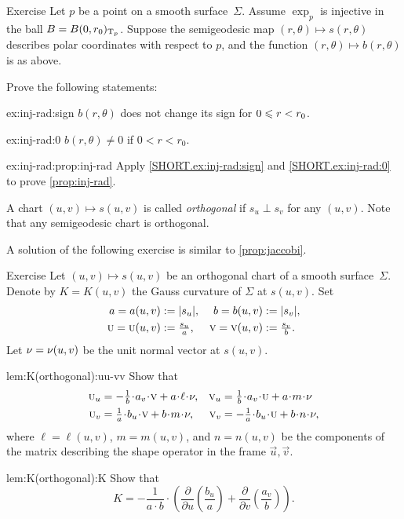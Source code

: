 \begin{thm}{Exercise}\label{ex:inj-rad}
Let $p$ be a point on a smooth surface~$\Sigma$.
Assume $\exp_p$ is injective in the ball $B=B(0,r_0)_{\mathrm{T}_p}$.
Suppose the semigeodesic map $(r,\theta)\mapsto s(r,\theta)$ describes polar coordinates with respect to $p$, and the function $(r,\theta)\mapsto b(r,\theta)$ is as above.

Prove the following statements:

\begin{subthm}{ex:inj-rad:sign}
$b(r,\theta)$ does not change its sign for $0\z\le r\z<r_0$.
\end{subthm}

\begin{subthm}{ex:inj-rad:0}
$b(r,\theta)\ne0$ if $0< r<r_0$.
\end{subthm}

\begin{subthm}{ex:inj-rad:prop:inj-rad}
Apply \ref{SHORT.ex:inj-rad:sign} and \ref{SHORT.ex:inj-rad:0} to prove \ref{prop:inj-rad}.
\end{subthm}
 
\end{thm}



A chart $(u,v)\mapsto s(u,v)$ is called \emph{orthogonal} if $s_u\perp s_v$ for any $(u,v)$.
Note that any semigeodesic chart is orthogonal.

A solution of the following exercise is similar to \ref{prop:jaccobi}.

\begin{thm}{Exercise}\label{lem:K(orthogonal)}
Let $(u,v)\mapsto s(u,v)$ be an orthogonal chart of a smooth surface~$\Sigma$.
Denote by $K=K(u,v)$ the Gauss curvature of $\Sigma$ at $s(u,v)$.
Set 
\begin{align*}
a=a(u,v)&\mathrel{:=}|s_u|,&
b=b(u,v)&\mathrel{:=}|s_v|,\\
\text{\sc{u}}=\text{\sc{u}}(u,v)&\mathrel{:=}\tfrac{s_u}a,&
\text{\sc{v}}=\text{\sc{v}}(u,v)&\mathrel{:=}\tfrac{s_v}b.
\end{align*}
Let $\nu=\nu(u,v)$ be the unit normal vector at $s(u,v)$.

\begin{subthm}{lem:K(orthogonal):uu-vv}
Show that 
\begin{align*}
\vec u_u
&=
-\tfrac1{b}\cdot a_v
\cdot
\vec v 
+
a\cdot \ell\cdot \Norm
,
&
\vec v_u
&=
\tfrac1{b}\cdot a_v
\cdot \vec u
+
a\cdot m\cdot \Norm
\\
\vec u_v
&=
\tfrac1{a}\cdot b_u\cdot\vec v
+
b\cdot m\cdot \Norm
,
&
\vec v_v
&=
-\tfrac1{a}\cdot b_u\cdot\vec u
+
b\cdot n\cdot \Norm,
\end{align*}
where $\ell=\ell(u,v)$, $m=m(u,v)$, and $n=n(u,v)$ be the components of the matrix describing the shape operator in the frame $\vec u, \vec v$.
\end{subthm}

\begin{subthm}{lem:K(orthogonal):K}
Show that
\[K=-\frac1{a\cdot b}\cdot
\left(
\frac{\partial}{\partial u}
\left(\frac{b_u}a \right)
+
\frac{\partial}{\partial v}
\left(\frac{a_v}b\right)
\right).\]
\end{subthm}
\end{thm}


